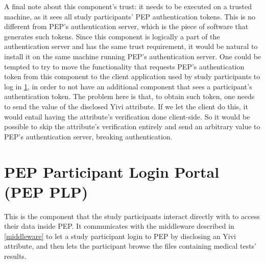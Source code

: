 \documentclass{report}
\begin{document}
A final note about this component's trust: it needs to be executed on a trusted machine, as it sees all study participants' PEP authentication tokens. This is no different from
PEP's authentication server, which is the piece of software that generates such tokens. Since this component is logically a part of the authentication server and has the same trust
requirement, it would be natural to install it on the same machine running PEP's authentication server. One could be tempted to try to move the functionality that requests PEP's
authentication token from this component to the client application used by study participants to log in \ref{pep_plp}, in order to not have an additional component that sees a
participant's authentication token. The problem here is that, to obtain such token, one needs to send the value of the disclosed Yivi attribute. If we let the client do this, it
would entail having the attribute's verification done client-side. So it would be possible to skip the attribute's verification entirely and send an arbitrary value to PEP's
authentication server, breaking authentication.


\section{PEP Participant Login Portal (PEP PLP)}\label{pep_plp}
This is the component that the study participants interact directly with to access their data inside PEP. It communicates with the middleware described in \ref{middleware} to
let a study participant login to PEP by disclosing an Yivi attribute, and then lets the participant browse the files containing medical tests' results. 
\end{document}
